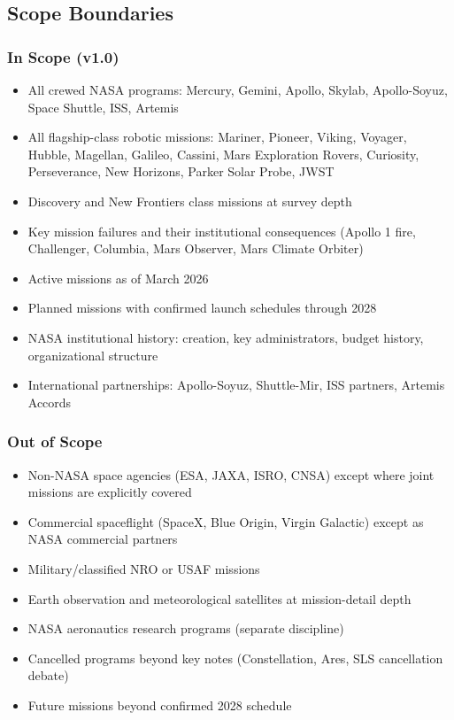 \documentclass[11pt,letterpaper]{article}
\begin{document}
\subsection{Scope Boundaries}

\subsubsection{In Scope (v1.0)}

\begin{itemize}[leftmargin=*]
  \item All crewed NASA programs: Mercury, Gemini, Apollo, Skylab, Apollo-Soyuz, Space Shuttle, ISS, Artemis
  \item All flagship-class robotic missions: Mariner, Pioneer, Viking, Voyager, Hubble, Magellan, Galileo, Cassini, Mars Exploration Rovers, Curiosity, Perseverance, New Horizons, Parker Solar Probe, JWST
  \item Discovery and New Frontiers class missions at survey depth
  \item Key mission failures and their institutional consequences (Apollo 1 fire, Challenger, Columbia, Mars Observer, Mars Climate Orbiter)
  \item Active missions as of March 2026
  \item Planned missions with confirmed launch schedules through 2028
  \item NASA institutional history: creation, key administrators, budget history, organizational structure
  \item International partnerships: Apollo-Soyuz, Shuttle-Mir, ISS partners, Artemis Accords
\end{itemize}

\subsubsection{Out of Scope}

\begin{itemize}[leftmargin=*]
  \item Non-NASA space agencies (ESA, JAXA, ISRO, CNSA) except where joint missions are explicitly covered
  \item Commercial spaceflight (SpaceX, Blue Origin, Virgin Galactic) except as NASA commercial partners
  \item Military/classified NRO or USAF missions
  \item Earth observation and meteorological satellites at mission-detail depth
  \item NASA aeronautics research programs (separate discipline)
  \item Cancelled programs beyond key notes (Constellation, Ares, SLS cancellation debate)
  \item Future missions beyond confirmed 2028 schedule
\end{itemize}
\end{document}
